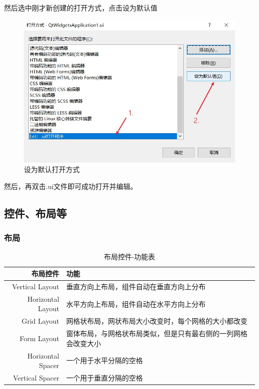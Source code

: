 \documentclass[cs4size,a4paper]{ctexart}
\numberwithin{equation}{section}
\numberwithin{table}{section}
\numberwithin{figure}{section}
\begin{document}
然后选中刚才新创建的打开方式，点击设为\colorbox{LetMeFlyGray}{默认值}

\begin{figure}[H]
\small
\centering
\includegraphics{设为默认打开方式.jpg}
\caption{设为默认打开方式} \label{fig:设为默认打开方式}
\end{figure}

然后，再双击\colorbox{LetMeFlyGray}{.ui文件}即可成功打开并编辑。

\subsection{控件、布局等}

\subsubsection{布局}

\begin{table}[H]
\caption{ 布局控件-功能表}
\centering
\begin{tabular}{r|l}
\toprule
布局控件 & 功能\\
\midrule[2pt]
Vertical Layout & 垂直方向上布局，组件自动在垂直方向上分布\\
Horizontal Layout & 水平方向上布局，组件自动在水平方向上分布\\
Grid Layout & 网格状布局，网状布局大小改变时，每个网格的大小都改变\\
Form Layout & 窗体布局，与网格状布局类似，但是只有最右侧的一列网格会改变大小\\
Horizontal Spacer & 一个用于水平分隔的空格\\
Vertical Spacer & 一个用于垂直分隔的空格\\
\bottomrule
\end{tabular}
\end{table}
\end{document}

